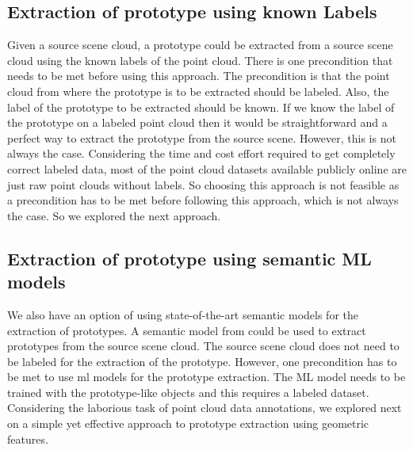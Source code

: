 \subsection{Extraction of prototype using known Labels}
Given a source scene cloud, a prototype could be extracted from a source scene cloud using the known labels of the point cloud. There is one precondition that needs to be met before using this approach. The precondition is that the point cloud from where the prototype is to be extracted should be labeled. Also, the label of the prototype to be extracted should be known. If we know the label of the prototype on a labeled point cloud then it would be straightforward and a perfect way to extract the prototype from the source scene. However, this is not always the case. Considering the time and cost effort required to get completely correct labeled data, most of the point cloud datasets available publicly online are just raw point clouds without labels. So choosing this approach is not feasible as a precondition has to be met before following this approach, which is not always the case. So we explored the next approach.

\subsection{Extraction of prototype using semantic ML models}
We also have an option of using state-of-the-art semantic models for the extraction of prototypes. A semantic model from \parencite{Chen2022} could be used to extract prototypes from the source scene cloud. The source scene cloud does not need to be labeled for the extraction of the prototype. However, one precondition has to be met to use \acrshort{ml} models for the prototype extraction. The ML model needs to be trained with the prototype-like objects and this requires a labeled dataset. Considering the laborious task of point cloud data annotations, we explored next on a simple yet effective approach to prototype extraction using geometric features.


